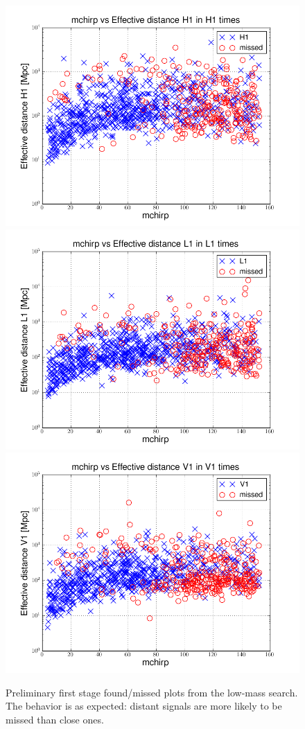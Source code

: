 \begin{figure}
  \includegraphics[width=0.5\linewidth]{figures/ninja2_results/H1-plotinspmissed_LOW_FULL_DATA_mchirp-eff_dist-log-H1-871147552-5209912_first} 
  \includegraphics[width=0.5\linewidth]{figures/ninja2_results/L1-plotinspmissed_LOW_FULL_DATA_mchirp-eff_dist-log-L1-871147552-5209912_first} \\
  \includegraphics[width=0.5\linewidth]{figures/ninja2_results/V1-plotinspmissed_LOW_FULL_DATA_mchirp-eff_dist-log-V1-871147552-5209912_first} \\
  \caption[First stage found/missed plots from the low-mass search]{
  \label{f:ninja2_cbc_results_low_first}
Preliminary first stage found/missed plots from the low-mass search.
The behavior is as expected: distant signals are more likely to be
missed than close ones.
}
\end{figure}%

